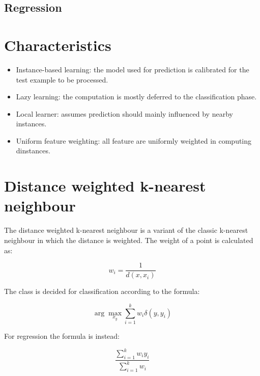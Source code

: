 	\subsection{Regression}

		

\section{Characteristics}

	\begin{multicols}{2}
		\begin{itemize}
			\item Instance-based learning: the model used for prediction is calibrated for the test example to be processed.
			\item Lazy learning: the computation is mostly deferred to the classification phase.
			\item Local learner: assumes prediction should mainly influenced by nearby instances.
			\item Uniform feature weighting: all feature are uniformly weighted in computing dinstances.
		\end{itemize}
	\end{multicols}

\section{Distance weighted k-nearest neighbour}
The distance weighted k-nearest neighbour is a variant of the classic k-nearest neighbour in which the distance is weighted.
The weight of a point is calculated as:

$$w_i = \frac{1}{d(x,x_i)}$$

The class is decided for classification according to the formula:

$$\arg\max\limits_{x_y}\sum\limits_{i = 1}^k w_i\delta(y, y_i)$$

For regression the formula is instead:

$$\dfrac{\sum\limits_{i = 1}^kw_iy_i}{\sum\limits_{i=1}^k w_i}$$

